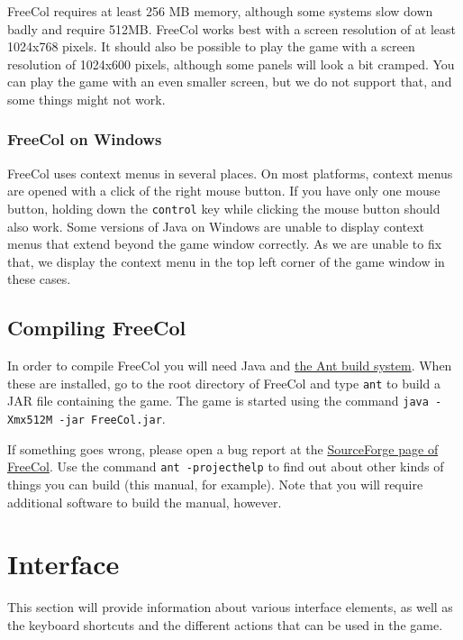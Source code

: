 \documentclass[12pt]{book}
\begin{document}
FreeCol requires at least 256 MB memory, although some systems slow
down badly and require 512MB. FreeCol works best with a screen
resolution of at least 1024x768 pixels. It should also be possible to
play the game with a screen resolution of 1024x600 pixels, although
some panels will look a bit cramped. You can play the game with an
even smaller screen, but we do not support that, and some things might
not work.

\hypertarget{FreeCol on Windows}{\subsection{FreeCol on Windows}}

FreeCol uses context menus in several places. On most platforms,
context menus are opened with a click of the right mouse button. If
you have only one mouse button, holding down the \texttt{control} key
while clicking the mouse button should also work. Some versions of
Java on Windows are unable to display context menus that extend beyond
the game window correctly. As we are unable to fix that, we display
the context menu in the top left corner of the game window in these
cases.


\hypertarget{Compiling FreeCol}{\section{Compiling FreeCol}}

In order to compile FreeCol you will need Java and
\href{http://ant.apache.org/}{the Ant build system}. When these are
installed, go to the root directory of FreeCol and type \verb$ant$ to
build a JAR file containing the game. The game is started using the
command \verb$java -Xmx512M -jar FreeCol.jar$.

If something goes wrong, please open a bug report at the
\href{http://sourceforge.net/projects/freecol}{SourceForge page of
 FreeCol}. Use the command \verb$ant -projecthelp$ to find out
about other kinds of things you can build (this manual, for
example). Note that you will require additional software to build the
manual, however.


\hypertarget{Interface}{\chapter{Interface}}

This section will provide information about various interface
elements, as well as the keyboard shortcuts and the different actions
that can be used in the game.
\end{document}
